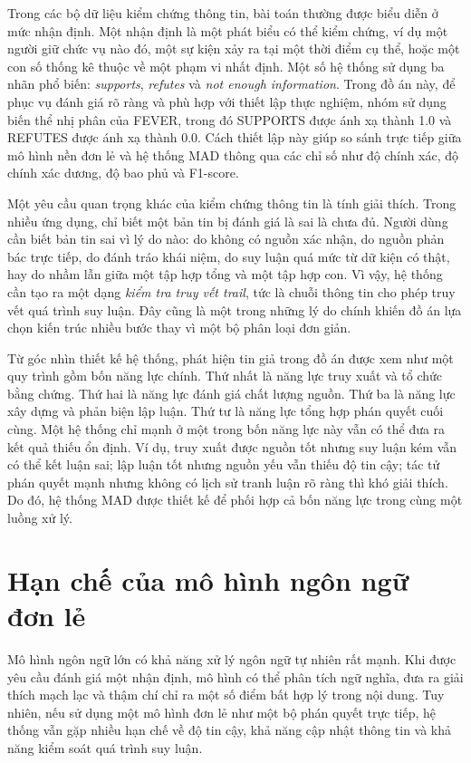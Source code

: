 ﻿\documentclass[oneside,a4paper,12pt]{extreport}
\begin{document}
Trong các bộ dữ liệu kiểm chứng thông tin, bài toán thường được biểu diễn ở mức nhận định. Một nhận định là một phát biểu có thể kiểm chứng, ví dụ một người giữ chức vụ nào đó, một sự kiện xảy ra tại một thời điểm cụ thể, hoặc một con số thống kê thuộc về một phạm vi nhất định. Một số hệ thống sử dụng ba nhãn phổ biến: \textit{supports}, \textit{refutes} và \textit{not enough information}. Trong đồ án này, để phục vụ đánh giá rõ ràng và phù hợp với thiết lập thực nghiệm, nhóm sử dụng biến thể nhị phân của FEVER, trong đó SUPPORTS được ánh xạ thành 1.0 và REFUTES được ánh xạ thành 0.0. Cách thiết lập này giúp so sánh trực tiếp giữa mô hình nền đơn lẻ và hệ thống MAD thông qua các chỉ số như độ chính xác, độ chính xác dương, độ bao phủ và F1-score.

Một yêu cầu quan trọng khác của kiểm chứng thông tin là tính giải thích. Trong nhiều ứng dụng, chỉ biết một bản tin bị đánh giá là sai là chưa đủ. Người dùng cần biết bản tin sai vì lý do nào: do không có nguồn xác nhận, do nguồn phản bác trực tiếp, do đánh tráo khái niệm, do suy luận quá mức từ dữ kiện có thật, hay do nhầm lẫn giữa một tập hợp tổng và một tập hợp con. Vì vậy, hệ thống cần tạo ra một dạng \textit{kiểm tra truy vết trail}, tức là chuỗi thông tin cho phép truy vết quá trình suy luận. Đây cũng là một trong những lý do chính khiến đồ án lựa chọn kiến trúc nhiều bước thay vì một bộ phân loại đơn giản.

Từ góc nhìn thiết kế hệ thống, phát hiện tin giả trong đồ án được xem như một quy trình gồm bốn năng lực chính. Thứ nhất là năng lực truy xuất và tổ chức bằng chứng. Thứ hai là năng lực đánh giá chất lượng nguồn. Thứ ba là năng lực xây dựng và phản biện lập luận. Thứ tư là năng lực tổng hợp phán quyết cuối cùng. Một hệ thống chỉ mạnh ở một trong bốn năng lực này vẫn có thể đưa ra kết quả thiếu ổn định. Ví dụ, truy xuất được nguồn tốt nhưng suy luận kém vẫn có thể kết luận sai; lập luận tốt nhưng nguồn yếu vẫn thiếu độ tin cậy; tác tử phán quyết mạnh nhưng không có lịch sử tranh luận rõ ràng thì khó giải thích. Do đó, hệ thống MAD được thiết kế để phối hợp cả bốn năng lực trong cùng một luồng xử lý.

\section{Hạn chế của mô hình ngôn ngữ đơn lẻ}

Mô hình ngôn ngữ lớn có khả năng xử lý ngôn ngữ tự nhiên rất mạnh. Khi được yêu cầu đánh giá một nhận định, mô hình có thể phân tích ngữ nghĩa, đưa ra giải thích mạch lạc và thậm chí chỉ ra một số điểm bất hợp lý trong nội dung. Tuy nhiên, nếu sử dụng một mô hình đơn lẻ như một bộ phán quyết trực tiếp, hệ thống vẫn gặp nhiều hạn chế về độ tin cậy, khả năng cập nhật thông tin và khả năng kiểm soát quá trình suy luận.
\end{document}
